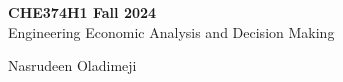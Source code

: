 \documentclass[openany,11pt,fleqn]{book} %
\begin{document}
\begingroup
\thispagestyle{empty}
\centering
\vspace*{5cm}
\par\normalfont\fontsize{35}{35}\sffamily\selectfont
\textbf{CHE374H1 Fall 2024}\\
{\LARGE Engineering Economic Analysis and Decision Making}\par %
\vspace*{1cm}
{\Huge Nasrudeen Oladimeji}\par %
\endgroup

\end{document}
